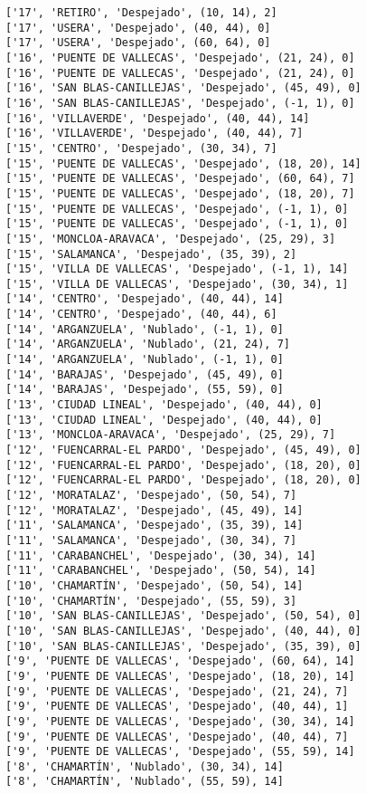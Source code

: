 \documentclass[11pt]{article}
\begin{document}
\begin{Verbatim}[commandchars=\\\{\}]
['17', 'RETIRO', 'Despejado', (10, 14), 2]
['17', 'USERA', 'Despejado', (40, 44), 0]
['17', 'USERA', 'Despejado', (60, 64), 0]
['16', 'PUENTE DE VALLECAS', 'Despejado', (21, 24), 0]
['16', 'PUENTE DE VALLECAS', 'Despejado', (21, 24), 0]
['16', 'SAN BLAS-CANILLEJAS', 'Despejado', (45, 49), 0]
['16', 'SAN BLAS-CANILLEJAS', 'Despejado', (-1, 1), 0]
['16', 'VILLAVERDE', 'Despejado', (40, 44), 14]
['16', 'VILLAVERDE', 'Despejado', (40, 44), 7]
['15', 'CENTRO', 'Despejado', (30, 34), 7]
['15', 'PUENTE DE VALLECAS', 'Despejado', (18, 20), 14]
['15', 'PUENTE DE VALLECAS', 'Despejado', (60, 64), 7]
['15', 'PUENTE DE VALLECAS', 'Despejado', (18, 20), 7]
['15', 'PUENTE DE VALLECAS', 'Despejado', (-1, 1), 0]
['15', 'PUENTE DE VALLECAS', 'Despejado', (-1, 1), 0]
['15', 'MONCLOA-ARAVACA', 'Despejado', (25, 29), 3]
['15', 'SALAMANCA', 'Despejado', (35, 39), 2]
['15', 'VILLA DE VALLECAS', 'Despejado', (-1, 1), 14]
['15', 'VILLA DE VALLECAS', 'Despejado', (30, 34), 1]
['14', 'CENTRO', 'Despejado', (40, 44), 14]
['14', 'CENTRO', 'Despejado', (40, 44), 6]
['14', 'ARGANZUELA', 'Nublado', (-1, 1), 0]
['14', 'ARGANZUELA', 'Nublado', (21, 24), 7]
['14', 'ARGANZUELA', 'Nublado', (-1, 1), 0]
['14', 'BARAJAS', 'Despejado', (45, 49), 0]
['14', 'BARAJAS', 'Despejado', (55, 59), 0]
['13', 'CIUDAD LINEAL', 'Despejado', (40, 44), 0]
['13', 'CIUDAD LINEAL', 'Despejado', (40, 44), 0]
['13', 'MONCLOA-ARAVACA', 'Despejado', (25, 29), 7]
['12', 'FUENCARRAL-EL PARDO', 'Despejado', (45, 49), 0]
['12', 'FUENCARRAL-EL PARDO', 'Despejado', (18, 20), 0]
['12', 'FUENCARRAL-EL PARDO', 'Despejado', (18, 20), 0]
['12', 'MORATALAZ', 'Despejado', (50, 54), 7]
['12', 'MORATALAZ', 'Despejado', (45, 49), 14]
['11', 'SALAMANCA', 'Despejado', (35, 39), 14]
['11', 'SALAMANCA', 'Despejado', (30, 34), 7]
['11', 'CARABANCHEL', 'Despejado', (30, 34), 14]
['11', 'CARABANCHEL', 'Despejado', (50, 54), 14]
['10', 'CHAMARTÍN', 'Despejado', (50, 54), 14]
['10', 'CHAMARTÍN', 'Despejado', (55, 59), 3]
['10', 'SAN BLAS-CANILLEJAS', 'Despejado', (50, 54), 0]
['10', 'SAN BLAS-CANILLEJAS', 'Despejado', (40, 44), 0]
['10', 'SAN BLAS-CANILLEJAS', 'Despejado', (35, 39), 0]
['9', 'PUENTE DE VALLECAS', 'Despejado', (60, 64), 14]
['9', 'PUENTE DE VALLECAS', 'Despejado', (18, 20), 14]
['9', 'PUENTE DE VALLECAS', 'Despejado', (21, 24), 7]
['9', 'PUENTE DE VALLECAS', 'Despejado', (40, 44), 1]
['9', 'PUENTE DE VALLECAS', 'Despejado', (30, 34), 14]
['9', 'PUENTE DE VALLECAS', 'Despejado', (40, 44), 7]
['9', 'PUENTE DE VALLECAS', 'Despejado', (55, 59), 14]
['8', 'CHAMARTÍN', 'Nublado', (30, 34), 14]
['8', 'CHAMARTÍN', 'Nublado', (55, 59), 14]

\end{Verbatim}
\end{document}
